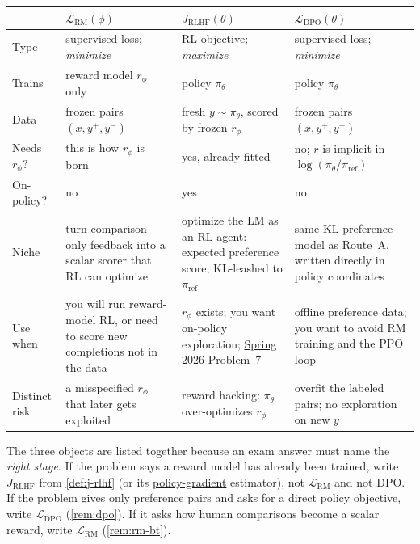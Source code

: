 \documentclass[11pt,a4paper]{article}
\newcommand{\jump}[2]{\hyperref[#1]{#2}}
\theoremstyle{definition}
\begin{document}
\begin{remark}
{\footnotesize
\setlength{\tabcolsep}{3.2pt}
\renewcommand{\arraystretch}{1.22}
\noindent
\begin{tabularx}{\linewidth}{|
  >{\raggedright\arraybackslash}p{2.15cm}|
  >{\raggedright\arraybackslash}X|
  >{\raggedright\arraybackslash}X|
  >{\raggedright\arraybackslash}X|
}
\hline
& $\mathcal{L}_{\mathrm{RM}}(\phi)$
& $J_{\mathrm{RLHF}}(\theta)$
& $\mathcal{L}_{\mathrm{DPO}}(\theta)$ \\
\hline
Type &
supervised loss; \emph{minimize} &
RL objective; \emph{maximize} &
supervised loss; \emph{minimize} \\
\hline
Trains &
reward model $r_\phi$ only &
policy $\pi_\theta$ &
policy $\pi_\theta$ \\
\hline
Data &
frozen pairs $(x,y^+,y^-)$ &
fresh $y\sim\pi_\theta$, scored by frozen $r_\phi$ &
frozen pairs $(x,y^+,y^-)$ \\
\hline
Needs $r_\phi$? &
this is how $r_\phi$ is born &
yes, already fitted &
no; $r$ is implicit in $\log(\pi_\theta/\pi_{\mathrm{ref}})$ \\
\hline
On-policy? &
no &
yes &
no \\
\hline
Niche &
turn comparison-only feedback into a scalar scorer that RL can optimize &
optimize the LM as an RL agent: expected preference score, KL-leashed to $\pi_{\mathrm{ref}}$ &
same KL-preference model as Route~A, written directly in policy coordinates \\
\hline
Use when &
you will run reward-model RL, or need to score new completions not in the data &
$r_\phi$ exists; you want on-policy exploration; \jump{prob:spr2026-rlhf}{Spring 2026 Problem~7} &
offline preference data; you want to avoid RM training and the PPO loop \\
\hline
Distinct risk &
a misspecified $r_\phi$ that later gets exploited &
reward hacking: $\pi_\theta$ over-optimizes $r_\phi$ &
overfit the labeled pairs; no exploration on new $y$ \\
\hline
\end{tabularx}
}

The three objects are listed together because an exam answer must name the \emph{right
stage}. If the problem says a reward model has already been trained, write
$J_{\mathrm{RLHF}}$ from \cref{def:j-rlhf} (or its
\jump{eq:policy-gradient}{policy-gradient} estimator), not $\mathcal{L}_{\mathrm{RM}}$
and not DPO. If the problem gives only preference pairs and asks for a direct policy
objective, write $\mathcal{L}_{\mathrm{DPO}}$ (\cref{rem:dpo}). If it asks how human
comparisons become a scalar reward, write $\mathcal{L}_{\mathrm{RM}}$
(\cref{rem:rm-bt}).
\end{remark}
\end{document}
